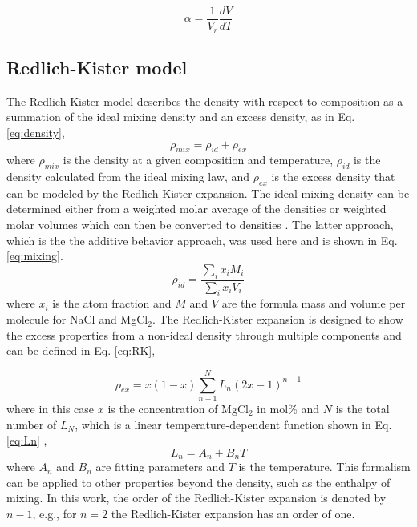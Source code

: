 \documentclass[review]{elsarticle}
\begin{document}
\begin{equation}
 \label{eq:CTE}
   \alpha = \frac{1}{V_{r}}\frac{dV}{dT}
\end{equation}

\subsection{Redlich-Kister model}
The Redlich-Kister model describes the density with respect to composition as a summation of the ideal mixing density and an excess density, as in Eq. \ref{eq:density},
\begin{equation}
 \label{eq:density}
   \rho_{mix} = \rho_{id} + \rho_{ex}
\end{equation}where $\rho_{mix}$ is the density at a given composition and temperature, $\rho_{id}$ is the density calculated from the ideal mixing law, and $\rho_{ex}$ is the excess density that can be modeled by the Redlich-Kister expansion. The ideal mixing density can be determined either from a weighted molar average of the densities \cite{guo1989density,cooper1991densities} or weighted molar volumes which can then be converted to densities \cite{agca2022,chrenkova2003density,mlynarikova2017volume}. The latter approach, which is the the additive behavior approach, was used here and is shown in Eq. \ref{eq:mixing}.
\begin{equation}
  \label{eq:mixing} 
     \rho_{id} = \frac{\sum_i x_iM_{i}}{\sum_i x_iV_{i}}
\end{equation}
where $x_i$ is the atom fraction and $M$ and $V$ are the formula mass and volume per molecule for NaCl and MgCl$_2$. The Redlich-Kister expansion \cite{redlich1948} is designed to show the excess properties from a non-ideal density through multiple components and can be defined in Eq. \ref{eq:RK},

\begin{equation}
  \label{eq:RK}
     \rho_{ex} = x(1-x) \sum_{n-1}^{N} L_n(2x-1)^{n-1}
\end{equation}
where in this case $x$ is the concentration of MgCl$_{2}$ in mol\% and $N$ is the total number of $L_{N}$, which is a linear temperature-dependent function shown in Eq. \ref{eq:Ln} \cite{agca2022},
\begin{equation}
  \label{eq:Ln}
     L_n = A_n+B_nT
\end{equation}
where $A_n$ and $B_n$ are fitting parameters and $T$ is the temperature. This formalism can be applied to other properties beyond the density, such as the enthalpy of mixing. In this work, the order of the Redlich-Kister expansion is denoted by $n-1$, e.g., for $n=2$ the Redlich-Kister expansion has an order of one.
\FloatBarrier
\end{document}
